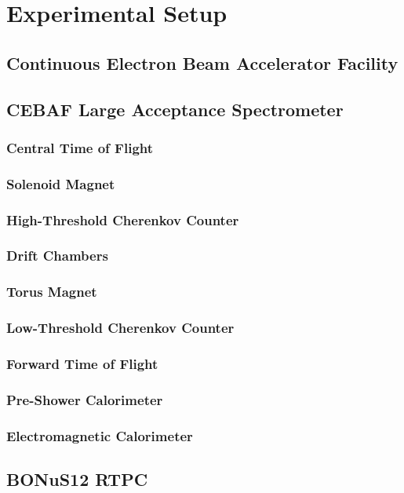 \chapter{Experimental Setup}
\label{ch:clas12}

\section{Continuous Electron Beam Accelerator Facility}

\section{CEBAF Large Acceptance Spectrometer}
\subsection{Central Time of Flight}
\subsection{Solenoid Magnet}
\subsection{High-Threshold Cherenkov Counter}
\subsection{Drift Chambers}
\subsection{Torus Magnet}
\subsection{Low-Threshold Cherenkov Counter}
\subsection{Forward Time of Flight}
\subsection{Pre-Shower Calorimeter}
\subsection{Electromagnetic Calorimeter}

\section{BONuS12 RTPC}


